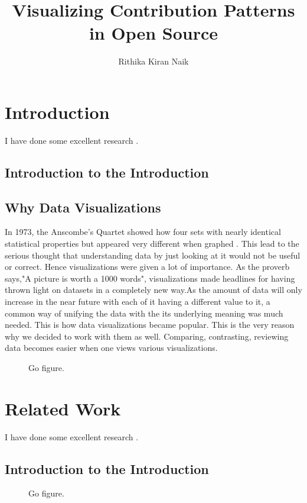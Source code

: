 \documentclass[double,12pt]{beavtex}
\title{Visualizing Contribution Patterns in Open Source}
\author{Rithika Kiran Naik}
\begin{document}
\maketitle

\mainmatter

\chapter{Introduction}
I have done some excellent research \cite{matrix}.
\section{Introduction to the Introduction}

\section{Why Data Visualizations}
In 1973, the Anscombe's Quartet showed how four sets with nearly identical statistical properties but appeared very different when graphed \cite{wiki}. This lead to the serious thought that understanding data by just looking at it would not be useful or correct. Hence visualizations were given a lot of importance. As the proverb says,"A picture is worth a 1000 words", visualizations made headlines for having thrown light on datasets in a completely new way.As the amount of data will only increase in the near future with each of it having a different value to it, a common way of unifying the data with the its underlying meaning was much needed. This is how data visualizations became popular. This is the very reason why we decided to work with them as well. Comparing, contrasting, reviewing data becomes easier when one views various visualizations.

\begin{figure}[!ht]
\centering
{}
\caption{Go figure.}
\end{figure}

\chapter{Related Work}
I have done some excellent research \cite{matrix}.
\section{Introduction to the Introduction}
\begin{figure}[!ht]
\centering
{}
\caption{Go figure.}
\end{figure}
\end{document}
